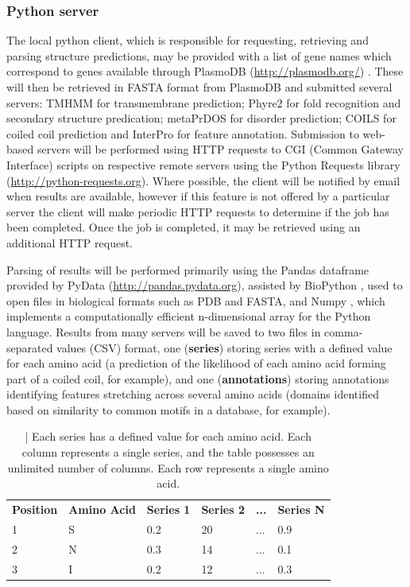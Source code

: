 \documentclass[fleqn,10pt]{article} %
\begin{document}
\subsubsection{Python server}

The local python client, which is responsible for requesting, retrieving and parsing structure predictions, may be provided with a list of gene names which correspond to genes available through PlasmoDB (\url{http://plasmodb.org/}) \cite{Aurrecoechea2009}. These will then be retrieved in FASTA format from PlasmoDB and submitted several servers: TMHMM for transmembrane prediction; Phyre2 for fold recognition and secondary structure predication; metaPrDOS for disorder prediction; COILS for coiled coil prediction and InterPro for feature annotation. Submission to web-based servers will be performed using HTTP requests to CGI (Common Gateway Interface) scripts on respective remote servers using the Python Requests library (\url{http://python-requests.org}). Where possible, the client will be notified by email when results are available, however if this feature is not offered by a particular server the client will make periodic HTTP requests to determine if the job has been completed. Once the job is completed, it may be retrieved using an additional HTTP request.

Parsing of results will be performed primarily using the Pandas dataframe provided by PyData (\url{http://pandas.pydata.org}), assisted by BioPython \cite{Cock2009}, used to open files in biological formats such as PDB and FASTA, and Numpy \cite{VanderWalt2011}, which implements a computationally efficient n-dimensional array for the Python language. Results from many servers will be saved to two files in comma-separated values (CSV) format, one (\textbf{series}) storing series with a defined value for each amino acid (a prediction of the likelihood of each amino acid forming part of a coiled coil, for example), and one (\textbf{annotations}) storing annotations identifying features stretching across several amino acids (domains identified based on similarity to common motifs in a database, for example).

\begin{table}[h]
\begin{tabular}{llllll}
\textbf{Position} & \textbf{Amino Acid} & \textbf{Series 1} & \textbf{Series 2} & \textbf{...} & \textbf{Series N} \\
1                 & S                   & 0.2               & 20                & ...          & 0.9               \\
2                 & N                   & 0.3               & 14                & ...          & 0.1               \\
3                 & I                   & 0.2               & 12                & ...          & 0.3              
\end{tabular}
\caption{ | Each series has a defined value for each amino acid. Each column represents a single series, and the table possesses an unlimited number of columns. Each row represents a single amino acid.}
\end{table}
\end{document}
